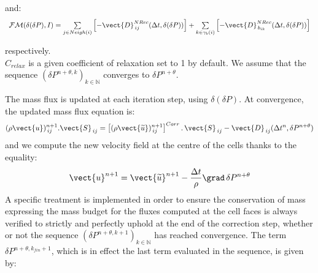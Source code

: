 and:
\begin{equation}
\begin{array}{ll}
\mathcal{FM}(\delta (\delta P),I) =
 \sum\limits_{j\in Neigh(i)}{\left[-\vect{D}^{NRec}_{\,ij}(\Delta t,\delta
(\delta P))\right]} +\sum\limits_{k\in {\gamma_b(i)}}
\left[-\vect{D}^{NRec}_{\,{b}_{ik}}(\Delta t,\delta(\delta P))\right]
\end{array}
\end{equation}

respectively.\\
$C_{relax}$ is a given coefficient of relaxation set to 1 by default.
We assume that the sequence $(\delta P^{n+\theta,k})_{k\in \mathbb{N}}$
converges
to $\delta P^{n+\theta}$.

The mass flux is updated at each iteration step, using $\delta(\delta P)$. At convergence, the updated mass flux equation is:
\begin{equation}
(\rho \vect{u})^{n+1}_{\,ij}\text{.}\vect{S}_{\,ij} =
\left[(\rho
\vect{\widetilde{u}})^{n+1}_{\,ij}\right]^{Corr}\text{.}\,\vect{S}_{\,ij}-\vect{D}_{\,ij}(\Delta
t^n,\delta P^{n+\theta})
\end{equation}
and we compute the new velocity field at the centre of the cells thanks
to the equality:
%
\begin{equation}
\vect{u}^{n+1} =
\vect{\widetilde{u}}^{n+1}-\frac{\Delta t}{\rho}\grad \,\delta P^{n+\theta}
\end{equation}
%
A specific treatment is implemented in order to ensure the conservation of
mass expressing the mass budget for the fluxes computed at the cell faces
is always verified to strictly and perfectly uphold at the end of
the correction step, whether or not the sequence
$(\delta P^{n+\theta,k+1})_{k\in \mathbb{N}}$ has
reached convergence. The term $\delta P^{n+\theta,k_{fin}+1}$, which is in
effect the last term evaluated in the sequence, is given by:

